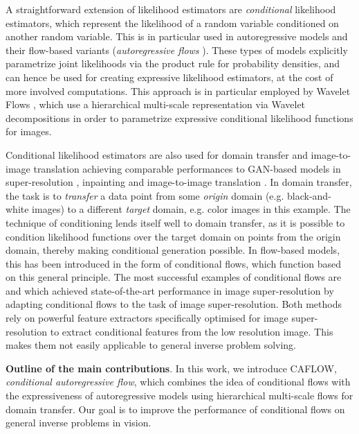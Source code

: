A straightforward extension of likelihood estimators are \emph{conditional} likelihood estimators, which represent the likelihood of a random variable conditioned on another random variable. This is in particular used in autoregressive models and their flow-based variants (\emph{autoregressive flows} \cite{autoregressive_flows}). These types of models explicitly parametrize joint likelihoods via the product rule for probability densities, and can hence be used for creating expressive likelihood estimators, at the cost of more involved computations. This approach is in particular employed by Wavelet Flows \cite{WAVELET-FLOW}, which use a hierarchical multi-scale representation via Wavelet decompositions in order to parametrize expressive conditional likelihood functions for images.

Conditional likelihood estimators are also used for domain transfer and image-to-image translation \cite{Dual-Glow, SRFLOW, ardizzone2019guided, cGLOW} achieving comparable performances to GAN-based models in super-resolution \cite{SRFLOW, HCFLOW}, inpainting \cite{cGLOW} and image-to-image translation \cite{Pumarola2020, Dual-Glow, grover2020alignflow}. In domain transfer, the task is to \emph{transfer} a data point from some \emph{origin} domain (e.g. black-and-white images) to a different \emph{target} domain, e.g. color images in this example. The technique of conditioning lends itself well to domain transfer, as it is possible to condition likelihood functions over the target domain on points from the origin domain, thereby making conditional generation possible. In flow-based models, this has been introduced in the form of conditional flows, which function based on this general principle. The most successful examples of conditional flows are \cite{SRFLOW} and \cite{HCFLOW} which achieved state-of-the-art performance in image super-resolution by adapting conditional flows to the task of image super-resolution. Both methods rely on powerful feature extractors specifically optimised for image super-resolution to extract conditional features from the low resolution image. This makes them not easily applicable to general inverse problem solving.

\medskip

\textbf{Outline of the main contributions}. In this work, we introduce CAFLOW, \emph{conditional autoregressive flow}, which combines the idea of conditional flows with the expressiveness of autoregressive models using hierarchical multi-scale flows for domain transfer. Our goal is to improve the performance of conditional flows on %
general inverse problems in vision.\color{black}

